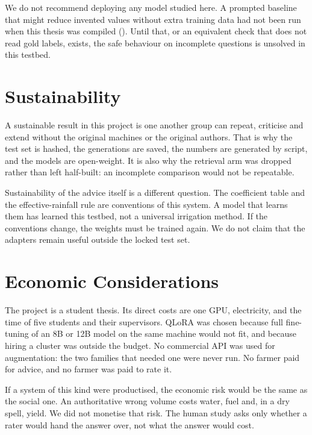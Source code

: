 We do not recommend deploying any model studied here. A prompted baseline that might reduce invented values without extra training data had not been run when this thesis was compiled (). Until that, or an equivalent check that does not read gold labels, exists, the safe behaviour on incomplete questions is unsolved in this testbed.

\section{Sustainability}
\label{sec:impact-sustain}

A sustainable result in this project is one another group can repeat, criticise and extend without the original machines or the original authors. That is why the test set is hashed, the generations are saved, the numbers are generated by script, and the models are open-weight. It is also why the retrieval arm was dropped rather than left half-built: an incomplete comparison would not be repeatable.

Sustainability of the advice itself is a different question. The coefficient table and the effective-rainfall rule are conventions of this system. A model that learns them has learned this testbed, not a universal irrigation method. If the conventions change, the weights must be trained again. We do not claim that the adapters remain useful outside the locked test set.

\section{Economic Considerations}
\label{sec:impact-econ}

The project is a student thesis. Its direct costs are one GPU, electricity, and the time of five students and their supervisors. QLoRA was chosen because full fine-tuning of an 8B or 12B model on the same machine would not fit, and because hiring a cluster was outside the budget. No commercial API was used for augmentation: the two families that needed one were never run. No farmer paid for advice, and no farmer was paid to rate it.

If a system of this kind were productised, the economic risk would be the same as the social one. An authoritative wrong volume costs water, fuel and, in a dry spell, yield. We did not monetise that risk. The human study asks only whether a rater would hand the answer over, not what the answer would cost.

